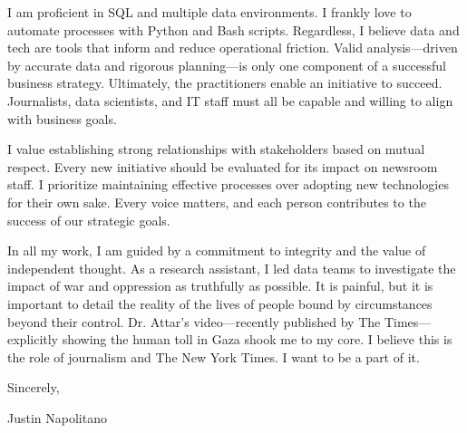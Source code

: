 \documentclass{cover-letter-class}
\begin{document}
{    \vspace{1em}

    I am proficient in SQL and multiple data environments. I frankly love to automate processes with Python and Bash scripts. Regardless, I believe data and tech are tools that inform and reduce operational friction. Valid analysis—driven by accurate data and rigorous planning—is only one component of a successful business strategy. Ultimately, the practitioners enable an initiative to succeed. Journalists, data scientists, and IT staff must all be capable and willing to align with business goals.

    
    \vspace{1em}

    I value establishing strong relationships with stakeholders based on mutual respect. Every new initiative should be evaluated for its impact on newsroom staff. I prioritize maintaining effective processes over adopting new technologies for their own sake. Every voice matters, and each person contributes to the success of our strategic goals.

    
    \vspace{1em}

    In all my work, I am guided by a commitment to integrity and the value of independent thought. As a research assistant, I led data teams to investigate the impact of war and oppression as truthfully as possible. It is painful, but it is important to detail the reality of the lives of people bound by circumstances beyond their control. Dr. Attar's video—recently published by The Times—explicitly showing the human toll in Gaza shook me to my core. I believe this is the role of journalism and The New York Times. I want to be a part of it.

    \vspace{1em}

    \noindent
    Sincerely,

    \vspace{1em}

    \noindent
    Justin Napolitano
}
\end{document}
